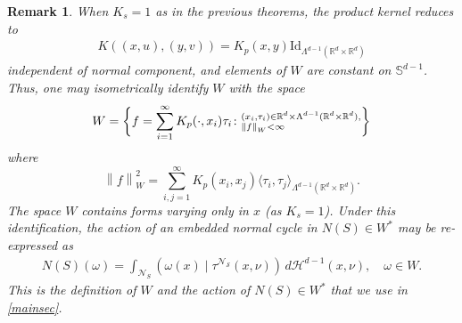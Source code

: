 \documentclass[sn-mathphys-num]{sn-jnl}%
\theoremstyle{thmstyleone}%
\theoremstyle{thmstyletwo}%
\newtheorem{remark}{Remark}%
\theoremstyle{thmstylethree}%
\numberwithin{remark}{section}
\numberwithin{definition}{section}
\numberwithin{equation}{section}
\numberwithin{theorem}{section}
\newcommand{\norm}[1]{\left\lVert#1\right\rVert}
\newcommand{\R}{\ensuremath{\mathbb{R}}}%
\begin{document}
\begin{remark}
When $K_{s}=1$ as in the previous theorems, the product kernel  reduces to 
\begin{align*}
    K((x,u),(y,v) )=K_{p}(x,y) \mathrm{Id}_{\Lambda^{d-1}(\R^{d}\times  \R^{d})}
\end{align*}
independent of normal component, and elements of $W$ are constant on $\mathbb{S}^{d-1}$. Thus, one may isometrically identify $W$ with the space 
\begin{equation}\label{newembeddingspace}
 W = \bigg\{f = \sum_{i=1}^{\infty}{K_{p}(\cdot,x_{i})\tau_{i} }\colon\begin{subarray}{l}  (x_{i},\tau_{i}) \in \R^{d}\times \Lambda^{d-1}(\R^{d}\times  \R^{d}),\\ \norm{f}_{W}<\infty\end{subarray}\bigg\}
\end{equation}
where
\[
\norm{f}_{W}^{2}=\sum_{i,j=1}^{\infty}{K_{p}(x_{i},x_{j})\langle \tau_{i},\tau_{j}\rangle_{\Lambda^{d-1
    }(\R^{d}\times  \R^{d}) } }.
\]
The space $W$ contains forms varying only in $x$ (as $K_s=1$). Under this identification, the action of an embedded normal cycle in $N(S) \in W^{*}$ may be re-expressed as
\begin{align}\label{newaction}
        N(S)(\omega) = \int_{\mathcal{N}_{S}}{(\omega(x)\mid \tau^{\mathcal{N_{S}}}(x,\nu))\,d\mathcal{H}^{d-1}(x,\nu)},\quad \omega \in W.
\end{align}
This is the definition of $W$ and the action of $N(S) \in W^{*}$ that we use in \cref{mainsec}.
\end{remark}
\end{document}
